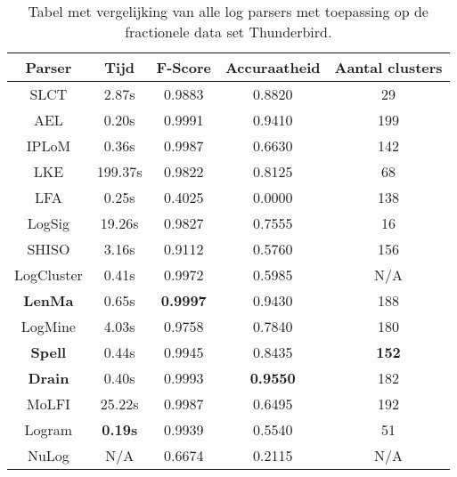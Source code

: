 \begin{table}[!htp]
    \caption{Tabel met vergelijking van alle log parsers met toepassing op de fractionele data set Thunderbird.}
    \label{tableThunderbird}
    \begin{center}
        \begin{tabular}{||c | c | c | c | c||} 
            \hline
            Parser & Tijd & F-Score & Accuraatheid & Aantal clusters \\ [0.5ex] 
            \hline\hline
            SLCT & 2.87s & 0.9883 & 0.8820 & 29 \\
            
            AEL & 0.20s & 0.9991 & 0.9410 & 199 \\ 
            
            IPLoM & 0.36s & 0.9987 & 0.6630 & 142 \\
            
            LKE & 199.37s & 0.9822 & 0.8125 & 68 \\
            
            LFA & 0.25s & 0.4025 & 0.0000 & 138 \\
            
            LogSig & 19.26s & 0.9827 & 0.7555 & 16 \\
            
            SHISO & 3.16s & 0.9112 & 0.5760 & 156 \\
            
            LogCluster & 0.41s & 0.9972 & 0.5985 & N/A \\
            
            \textbf{LenMa} & 0.65s & \textbf{0.9997} & 0.9430 & 188 \\
            
            LogMine & 4.03s & 0.9758 & 0.7840 & 180 \\
            
            \textbf{Spell} & 0.44s & 0.9945 & 0.8435 & \textbf{152} \\
            
            \textbf{Drain} & 0.40s & 0.9993 & \textbf{0.9550} & 182 \\
            
            MoLFI & 25.22s & 0.9987 & 0.6495 & 192 \\
            
            Logram & \textbf{0.19s} & 0.9939 & 0.5540 & 51 \\
            
            NuLog & N/A & 0.6674 & 0.2115 & N/A \\
            \hline
        \end{tabular}
    \end{center}
\end{table}

